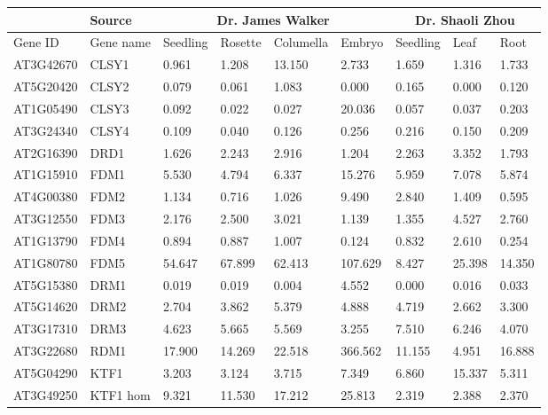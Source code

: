 \begin{landscape}
\begin{longtable}{l|l|llll|lll}
          & Source                                                 & \multicolumn{4}{c|}{Dr. James Walker}   & \multicolumn{3}{c}{Dr. Shaoli Zhou} \\ \hline
\endfirsthead
%
\endhead
%
Gene ID   & Gene name                                              & Seedling & Rosette & Columella & Embryo & Seedling    & Leaf      & Root      \\ \hline
AT3G42670 & CLSY1    & 0.961  & 1.208  & 13.150 & 2.733   & 1.659  & 1.316  & 1.733  \\
AT5G20420 & CLSY2    & 0.079  & 0.061  & 1.083  & 0.000   & 0.165  & 0.000  & 0.120  \\
AT1G05490 & CLSY3    & 0.092  & 0.022  & 0.027  & 20.036  & 0.057  & 0.037  & 0.203  \\
AT3G24340 & CLSY4    & 0.109  & 0.040  & 0.126  & 0.256   & 0.216  & 0.150  & 0.209  \\ \hline
AT2G16390 & DRD1     & 1.626  & 2.243  & 2.916  & 1.204   & 2.263  & 3.352  & 1.793  \\ \hline
AT1G15910 & FDM1     & 5.530  & 4.794  & 6.337  & 15.276  & 5.959  & 7.078  & 5.874  \\
AT4G00380 & FDM2     & 1.134  & 0.716  & 1.026  & 9.490   & 2.840  & 1.409  & 0.595  \\
AT3G12550 & FDM3     & 2.176  & 2.500  & 3.021  & 1.139   & 1.355  & 4.527  & 2.760  \\
AT1G13790 & FDM4     & 0.894  & 0.887  & 1.007  & 0.124   & 0.832  & 2.610  & 0.254  \\
AT1G80780 & FDM5     & 54.647 & 67.899 & 62.413 & 107.629 & 8.427  & 25.398 & 14.350 \\ \hline
AT5G15380 & DRM1     & 0.019  & 0.019  & 0.004  & 4.552   & 0.000  & 0.016  & 0.033  \\
AT5G14620 & DRM2     & 2.704  & 3.862  & 5.379  & 4.888   & 4.719  & 2.662  & 3.300  \\
AT3G17310 & DRM3     & 4.623  & 5.665  & 5.569  & 3.255   & 7.510  & 6.246  & 4.070  \\ \hline
AT3G22680 & RDM1     & 17.900 & 14.269 & 22.518 & 366.562 & 11.155 & 4.951  & 16.888 \\ \hline
AT5G04290 & KTF1     & 3.203  & 3.124  & 3.715  & 7.349   & 6.860  & 15.337 & 5.311  \\
AT3G49250 & KTF1 hom & 9.321  & 11.530 & 17.212 & 25.813  & 2.319  & 2.388  & 2.370  \\

\end{longtable}
\end{landscape}
